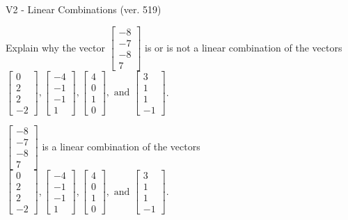 \begin{exercise}
  \begin{exerciseTitle}V2 - Linear Combinations (ver. 519)\end{exerciseTitle}
  \begin{exerciseStatement}
    Explain why the vector \(\left[\begin{array}{c}
-8 \\
-7 \\
-8 \\
7
\end{array}\right]\)  is or is not a linear 
	combination of the vectors \(\left[\begin{array}{c}
0 \\
2 \\
2 \\
-2
\end{array}\right] , \left[\begin{array}{c}
-4 \\
-1 \\
-1 \\
1
\end{array}\right] , \left[\begin{array}{c}
4 \\
0 \\
1 \\
0
\end{array}\right] , \text{ and } \left[\begin{array}{c}
3 \\
1 \\
1 \\
-1
\end{array}\right]\).
	


  \end{exerciseStatement}
  \begin{exerciseAnswer}
   \(\left[\begin{array}{c}
-8 \\
-7 \\
-8 \\
7
\end{array}\right]\) 
  	 is  
	a linear combination of the vectors \(\left[\begin{array}{c}
0 \\
2 \\
2 \\
-2
\end{array}\right] , \left[\begin{array}{c}
-4 \\
-1 \\
-1 \\
1
\end{array}\right] , \left[\begin{array}{c}
4 \\
0 \\
1 \\
0
\end{array}\right] , \text{ and } \left[\begin{array}{c}
3 \\
1 \\
1 \\
-1
\end{array}\right]\).


\end{exerciseAnswer}
\end{exercise}
